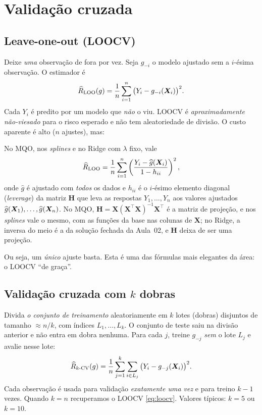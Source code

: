 \documentclass[11pt,a4paper]{article}
\begin{document}
\section{Validação cruzada}
\subsection{Leave-one-out (LOOCV)}
Deixe \emph{uma} observação de fora por vez. Seja $g_{-i}$ o modelo ajustado sem a
$i$-ésima observação. O estimador é
\begin{equation}\label{eq:loocv}
  \widehat{R}_{\text{LOO}}(g) = \frac1n \sum_{i=1}^n \big(Y_i - g_{-i}(\bm{X}_i)\big)^2 .
\end{equation}
Cada $Y_i$ é predito por um modelo que \emph{não} o viu. LOOCV é
\emph{aproximadamente não-viesado} para o risco esperado e não tem aleatoriedade de
divisão. O custo aparente é alto ($n$ ajustes), mas:

\begin{proposicao}\label{prop:loo}
No MQO, nos \emph{splines} e no Ridge com $\lambda$ fixo, vale
\[
  \widehat{R}_{\text{LOO}}
   = \frac1n \sum_{i=1}^n \left( \frac{Y_i-\widehat{g}(\bm{X}_i)}{1-h_{ii}} \right)^2,
\]
onde $\widehat g$ é ajustado com \emph{todos} os dados e $h_{ii}$ é o $i$-ésimo
elemento diagonal (\emph{leverage}) da matriz $\bm{H}$ que leva as respostas
$Y_1,\dots,Y_n$ aos valores ajustados $\widehat g(\bm{X}_1),\dots,\widehat g(\bm{X}_n)$. No
MQO, $\bm{H}=\bm{X}(\bm{X}^\top\bm{X})^{-1}\bm{X}^\top$ é a matriz de projeção, e
nos \emph{splines} vale o mesmo, com as funções da base nas colunas de $\bm{X}$; no
Ridge, a inversa do meio é a da solução fechada da Aula~02, e $\bm{H}$ deixa de ser
uma projeção.
\end{proposicao}
Ou seja, um \emph{único} ajuste basta. Esta é uma das fórmulas mais elegantes da
área: o LOOCV ``de graça''.

\subsection{Validação cruzada com $k$ dobras}
Divida \emph{o conjunto de treinamento} aleatoriamente em $k$ lotes (dobras)
disjuntos de tamanho $\approx n/k$, com índices $L_1,\dots,L_k$. O conjunto de teste
saiu na divisão anterior e não entra em dobra nenhuma. Para cada $j$, treine
$g_{-j}$ \emph{sem} o lote $L_j$ e avalie nesse lote:
\begin{equation}\label{eq:kfold}
  \widehat{R}_{k\text{-CV}}(g)
   = \frac1n \sum_{j=1}^{k} \sum_{i\in L_j} \big(Y_i - g_{-j}(\bm{X}_i)\big)^2 .
\end{equation}
Cada observação é usada para validação \emph{exatamente uma vez} e para treino
$k-1$ vezes. Quando $k=n$ recuperamos o LOOCV \eqref{eq:loocv}. Valores típicos:
$k=5$ ou $k=10$.
\end{document}
